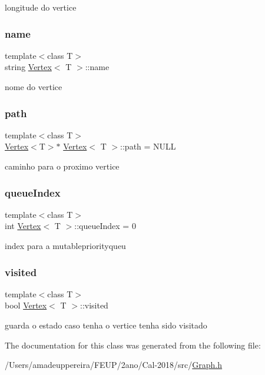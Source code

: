 longitude do vertice \mbox{\label{class_vertex_a1990577b54c37df981c81eac40c4af71}} 
\subsubsection{\texorpdfstring{name}{name}}
{\footnotesize\ttfamily template$<$class T$>$ \\
string \mbox{\hyperlink{class_vertex}{Vertex}}$<$ T $>$\+::name\hspace{0.3cm}{\ttfamily [private]}}

nome do vertice \mbox{\label{class_vertex_ab968bdd80f912a6f21f30e479bf735ce}} 
\subsubsection{\texorpdfstring{path}{path}}
{\footnotesize\ttfamily template$<$class T$>$ \\
\mbox{\hyperlink{class_vertex}{Vertex}}$<$T$>$$\ast$ \mbox{\hyperlink{class_vertex}{Vertex}}$<$ T $>$\+::path = N\+U\+LL\hspace{0.3cm}{\ttfamily [private]}}

caminho para o proximo vertice \mbox{\label{class_vertex_a721ab622207a73c5fae7b9abad6c07cc}} 
\subsubsection{\texorpdfstring{queue\+Index}{queueIndex}}
{\footnotesize\ttfamily template$<$class T$>$ \\
int \mbox{\hyperlink{class_vertex}{Vertex}}$<$ T $>$\+::queue\+Index = 0\hspace{0.3cm}{\ttfamily [private]}}

index para a mutablepriorityqueu \mbox{\label{class_vertex_a187a2fe4ff50261cf3c15b8cda7dfc56}} 
\subsubsection{\texorpdfstring{visited}{visited}}
{\footnotesize\ttfamily template$<$class T$>$ \\
bool \mbox{\hyperlink{class_vertex}{Vertex}}$<$ T $>$\+::visited\hspace{0.3cm}{\ttfamily [private]}}

guarda o estado caso tenha o vertice tenha sido visitado 

The documentation for this class was generated from the following file\+:\begin{DoxyCompactItemize}
\item 
/\+Users/amadeuppereira/\+F\+E\+U\+P/2ano/\+Cal-\/2018/src/\mbox{\hyperlink{_graph_8h}{Graph.\+h}}\end{DoxyCompactItemize}
